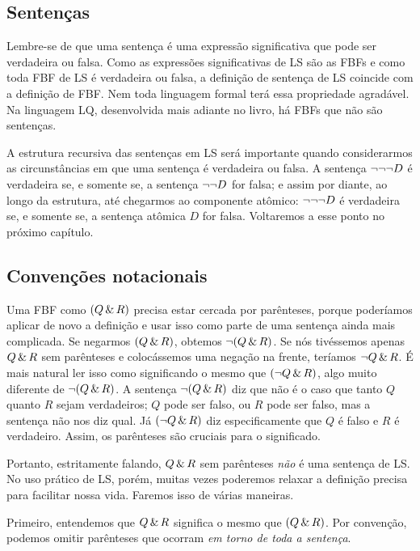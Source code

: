 \subsection{Sentenças}
Lembre-se de que uma sentença é uma expressão significativa que pode ser verdadeira ou falsa. Como as expressões significativas de LS são as FBFs e como toda FBF de LS é verdadeira ou falsa, a definição de sentença de LS coincide com a definição de FBF. Nem toda linguagem formal terá essa propriedade agradável. Na linguagem LQ, desenvolvida mais adiante no livro, há FBFs que não são sentenças.

A estrutura recursiva das sentenças em LS será importante quando considerarmos as circunstâncias em que uma sentença é verdadeira ou falsa. A sentença $\neg \neg \neg D$ é verdadeira se, e somente se, a sentença $\neg \neg D$ for falsa; e assim por diante, ao longo da estrutura, até chegarmos ao componente atômico: $\neg \neg \neg D$ é verdadeira se, e somente se, a sentença atômica $D$ for falsa. Voltaremos a esse ponto no próximo capítulo.


\subsection{Convenções notacionais}
\label{LSconventions}
Uma FBF como $(Q \,\&\, R)$ precisa estar cercada por parênteses, porque poderíamos aplicar de novo a definição e usar isso como parte de uma sentença ainda mais complicada. Se negarmos $(Q \,\&\, R)$, obtemos $\neg(Q \,\&\, R)$. Se nós tivéssemos apenas $Q \,\&\, R$ sem parênteses e colocássemos uma negação na frente, teríamos $\neg Q \,\&\, R$. É mais natural ler isso como significando o mesmo que $(\neg Q \,\&\, R)$, algo muito diferente de $\neg(Q\,\&\, R)$. A sentença $\neg(Q \,\&\, R)$ diz que não é o caso que tanto $Q$ quanto $R$ sejam verdadeiros; $Q$ pode ser falso, ou $R$ pode ser falso, mas a sentença não nos diz qual. Já $(\neg Q \,\&\, R)$ diz especificamente que $Q$ é falso e $R$ é verdadeiro. Assim, os parênteses são cruciais para o significado.

Portanto, estritamente falando, $Q \,\&\, R$ sem parênteses \emph{não} é uma sentença de LS. No uso prático de LS, porém, muitas vezes poderemos relaxar a definição precisa para facilitar nossa vida. Faremos isso de várias maneiras.

Primeiro, entendemos que $Q \,\&\, R$ significa o mesmo que $(Q \,\&\, R)$. Por convenção, podemos omitir parênteses que ocorram \emph{em torno de toda a sentença}.

